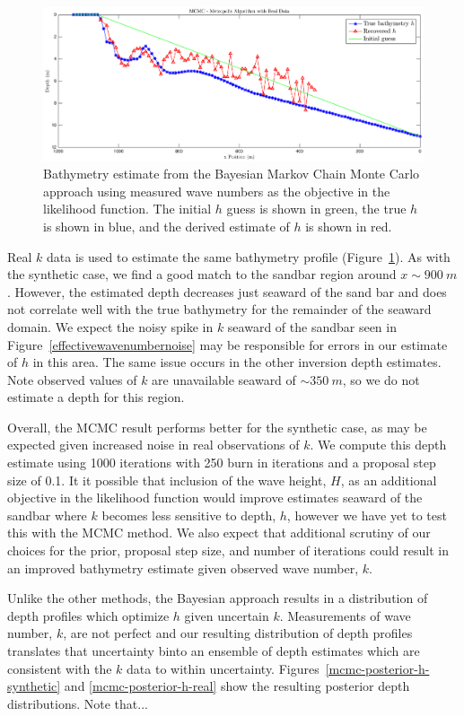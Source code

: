 \begin{figure}[H]
\center
\includegraphics[scale=0.46]{img/MCMC-realdata-600.eps}
\caption{Bathymetry estimate from the Bayesian Markov Chain Monte Carlo approach using measured wave numbers as the objective in the likelihood function. The initial $h$ guess is shown in green, the true $h$ is shown in blue, and the derived estimate of $h$ is shown in red.}
\label{mcmc-real}
\end{figure}

Real $k$ data is used to estimate the same bathymetry profile (Figure~\ref{mcmc-real}). As with the synthetic case, we find a good match to the sandbar region around $x\sim900~m$. However, the estimated depth decreases just seaward of the sand bar and does not correlate well with the true bathymetry for the remainder of the seaward domain. We expect the noisy spike in $k$ seaward of the sandbar seen in  Figure~\ref{effectivewavenumbernoise} may be responsible for errors in our estimate of $h$ in this area. The same issue occurs in the other inversion depth estimates. Note observed values of $k$ are unavailable seaward of $\sim350~m$, so we do not estimate a depth for this region. 

Overall, the MCMC result performs better for the synthetic case, as may be expected given increased noise in real observations of $k$. We compute this depth estimate using 1000 iterations with 250 burn in iterations and a proposal step size of 0.1. It it possible that inclusion of the wave height, $H$, as an additional objective in the likelihood function would improve estimates seaward of the sandbar where $k$ becomes less sensitive to depth, $h$, however we have yet to test this with the MCMC method. We also expect that additional scrutiny of our choices for the prior, proposal step size, and number of iterations could result in an improved bathymetry estimate given observed wave number, $k$. 

Unlike the other methods, the Bayesian approach results in a distribution of depth profiles which optimize $h$ given uncertain $k$. Measurements of wave number, $k$, are not perfect and our resulting distribution of depth profiles translates that uncertainty binto an ensemble of depth estimates which are consistent with the $k$ data to within uncertainty. Figures~\ref{mcmc-posterior-h-synthetic} and \ref{mcmc-posterior-h-real} show the resulting posterior depth distributions. Note that...






